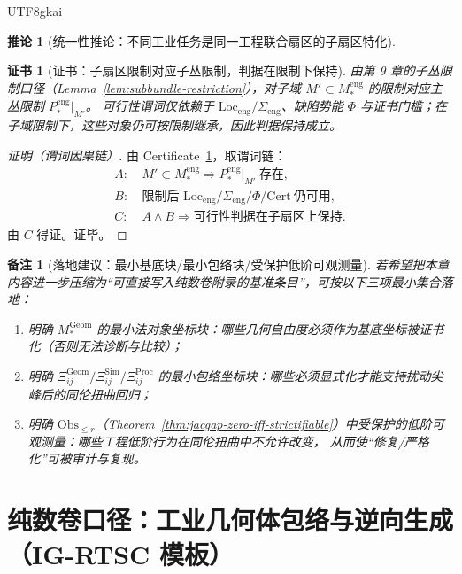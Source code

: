 \documentclass[12pt]{article}
\newtheorem{corollary}{推论}[section]
\newtheorem{remark}{备注}[section]
\newtheorem{certificate}{证书}[section]
\begin{document}
\begin{CJK*}{UTF8}{gkai}
\begin{corollary}[统一性推论：不同工业任务是同一工程联合扇区的子扇区特化]
\end{corollary}

\begin{certificate}[证书：子扇区限制对应子丛限制，判据在限制下保持]
\label{cert:eng-unified-subsectors}
由第 9 章的子丛限制口径（Lemma~\ref{lem:subbundle-restriction}），对子域 $M'\subset M_\ast^{\mathrm{eng}}$ 的限制对应主丛限制
  $P_\ast^{\mathrm{eng}}|_{M'}$。
可行性谓词仅依赖于 $\mathrm{Loc}_{\mathrm{eng}}/\Sigma_{\mathrm{eng}}$、缺陷势能 $\Phi$ 与证书门槛；在子域限制下，这些对象仍可按限制继承，因此判据保持成立。
\end{certificate}

\begin{proof}[证明（谓词因果链）]
由 Certificate~\ref{cert:eng-unified-subsectors}，取谓词链：
\[
\begin{aligned}
A:&\ M'\subset M_\ast^{\mathrm{eng}}\Rightarrow P_\ast^{\mathrm{eng}}|_{M'}\ \text{存在},\\
B:&\ \text{限制后 }\mathrm{Loc}_{\mathrm{eng}}/\Sigma_{\mathrm{eng}}/\Phi/\mathrm{Cert}\ \text{仍可用},\\
C:&\ A\wedge B\Rightarrow \text{可行性判据在子扇区上保持}.
\end{aligned}
\]
由 $C$ 得证。证毕。
\end{proof}

\begin{remark}[落地建议：最小基底块/最小包络块/受保护低阶可观测量]
若希望把本章内容进一步压缩为“可直接写入纯数卷附录的基准条目”，可按以下三项最小集合落地：
\begin{enumerate}
  \item 明确 $M_\ast^{\mathrm{Geom}}$ 的最小法对象坐标块：哪些几何自由度必须作为基底坐标被证书化（否则无法诊断与比较）；
  \item 明确 $\Xi_{ij}^{\mathrm{Geom}}/\Xi_{ij}^{\mathrm{Sim}}/\Xi_{ij}^{\mathrm{Proc}}$ 的最小包络坐标块：哪些必须显式化才能支持扰动尖峰后的同伦扭曲回归；
  \item 明确 $\mathrm{Obs}_{\le r}$（Theorem~\ref{thm:jacgap-zero-iff-strictifiable}）中受保护的低阶可观测量：哪些工程低阶行为在同伦扭曲中不允许改变，
    从而使“修复/严格化”可被审计与复现。
\end{enumerate}
\end{remark}

\clearpage
\section{纯数卷口径：工业几何体包络与逆向生成（\textsf{IG-RTSC} 模板）}
\label{sec:puremath-industrial-envelope}


\end{CJK*}
\end{document}
